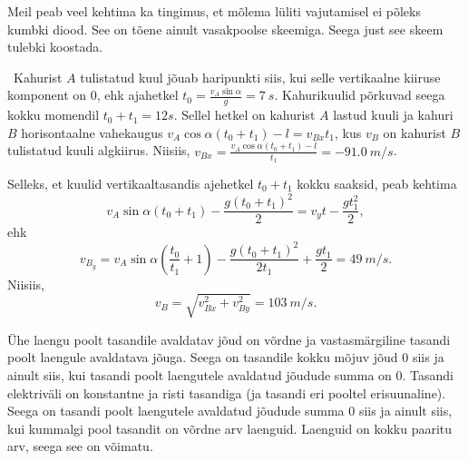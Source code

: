 \documentclass[10pt]{article}
\begin{document}
Meil peab veel kehtima ka tingimus, et mõlema lüliti vajutamisel ei põleks kumbki diood. See on tõene ainult vasakpoolse skeemiga. Seega just see skeem tulebki koostada.
\probend
\bigskip


\solu
\
Kahurist $A$ tulistatud kuul jõuab haripunkti siis, kui selle vertikaalne kiiruse komponent on $0$, ehk ajahetkel $t_0 = \frac{v_A\sin\alpha}{g} = \SI{7}{s}$. Kahurikuulid põrkuvad seega kokku momendil $t_0 + t_1 = \SI{12}s$. Sellel hetkel on kahurist $A$ lastud kuuli ja kahuri $B$ horisontaalne vahekaugus $v_A\cos\alpha(t_0 + t_1) - l = v_{Bx}t_1$, kus $v_B$ on kahurist $B$ tulistatud kuuli algkiirus. Niisiis, $v_{Bx} = \frac{v_A\cos\alpha(t_0 + t_1) - l}{t_1} = \SI{-91.0}{m/s}$.

Selleks, et kuulid vertikaaltasandis ajehetkel $t_0 + t_1$ kokku saaksid, peab kehtima
\[
v_A\sin\alpha (t_0 + t_1) - \frac{g(t_0 + t_1)^2}{2} = v_yt - \frac{gt_1^2}{2},
\]
ehk
\[
v_{B_y} = v_A\sin\alpha \left(\frac{t_0}{t_1} + 1\right) - \frac{g(t_0 + t_1)^2}{2t_1} + \frac{gt_1}{2} = \SI{49}{m/s}.
\]
Niisiis,
\[
v_B = \sqrt{v_{Bx}^2 + v_{By}^2} = \SI{103}{m/s}.
\]
\probend
\bigskip


\solu
Ühe laengu poolt tasandile avaldatav jõud on võrdne ja vastasmärgiline tasandi poolt laengule avaldatava jõuga. Seega on tasandile kokku mõjuv jõud 0 siis ja ainult siis, kui tasandi poolt laengutele avaldatud jõudude summa on 0. Tasandi elektriväli on konstantne ja risti tasandiga (ja tasandi eri pooltel erisuunaline). Seega on tasandi poolt laengutele avaldatud jõudude summa 0 siis ja ainult siis, kui kummalgi pool tasandit on võrdne arv laenguid. Laenguid on kokku paaritu arv, seega see on võimatu.
\probend
\bigskip

\setAuthor{}
\end{document}
